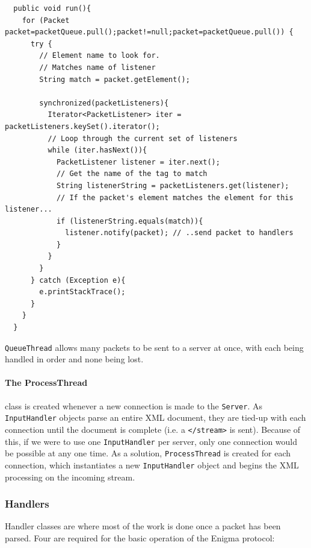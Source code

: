       \begin{lstlisting}
  public void run(){
    for (Packet packet=packetQueue.pull();packet!=null;packet=packetQueue.pull()) {
      try {
        // Element name to look for.
        // Matches name of listener
        String match = packet.getElement();

        synchronized(packetListeners){
          Iterator<PacketListener> iter = packetListeners.keySet().iterator();
          // Loop through the current set of listeners
          while (iter.hasNext()){
            PacketListener listener = iter.next();
            // Get the name of the tag to match
            String listenerString = packetListeners.get(listener);
            // If the packet's element matches the element for this listener...
            if (listenerString.equals(match)){
              listener.notify(packet); // ..send packet to handlers
            } 
          } 
        } 
      } catch (Exception e){
        e.printStackTrace();
      }
    } 
  } 
      \end{lstlisting}
      
      \verb!QueueThread! allows many packets to be sent to a server at once, with each being handled in order and none being lost.
    
      \paragraph{The ProcessThread} class is created whenever a new connection is made to the \verb!Server!. As \verb!InputHandler! objects parse an entire XML document, they are tied-up with each connection until the document is complete (i.e. a \verb!</stream>! is sent). Because of this, if we were to use one \verb!InputHandler! per server, only one connection would be possible at any one time. As a solution, \verb!ProcessThread! is created for each connection, which instantiates a new \verb!InputHandler! object and begins the XML processing on the incoming stream.
    
    \subsubsection{Handlers}
    \label{subsubsec:handlers}
    
    Handler classes are where most of the work is done once a packet has been parsed. Four are required for the basic operation of the Enigma protocol:
    
